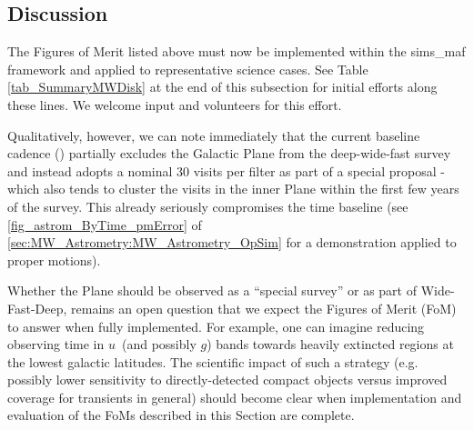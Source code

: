 



\subsection{Discussion}
\label{sec:\secname:MW_Disk_discussion}

The Figures of Merit listed above must now be implemented within the
sims\_maf framework and applied to representative science cases.
See Table \ref{tab_SummaryMWDisk} at the end of this subsection for
initial efforts along these lines. We welcome input and volunteers for
this effort.

Qualitatively, however, we can note immediately that the current
baseline cadence () partially excludes the
Galactic Plane from the deep-wide-fast survey and instead adopts a
nominal 30 visits per filter as part of a special proposal - which
also tends to cluster the visits in the inner Plane within the first
few years of the survey. This already seriously compromises the time
baseline (see \autoref{fig_astrom_ByTime_pmError} of
\autoref{sec:MW_Astrometry:MW_Astrometry_OpSim} for a demonstration applied to
proper motions).

Whether the Plane should be observed as a ``special survey'' or
  as part of Wide-Fast-Deep, remains an open question that we expect
  the Figures of Merit (FoM) to answer when fully implemented. For
  example, one can imagine reducing observing time in $u$~(and
  possibly $g$) bands towards heavily extincted regions at the lowest
  galactic latitudes. The scientific impact of such a strategy
  (e.g. possibly lower sensitivity to directly-detected compact
  objects versus improved coverage for transients in general) should
  become clear when implementation and evaluation of the FoMs
  described in this Section are complete.




